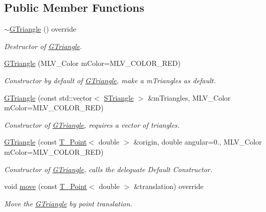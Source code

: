 \subsection*{Public Member Functions}
\begin{DoxyCompactItemize}
\item 
\mbox{\label{classGTriangle_a05bcaee071e6dc6591220869234b05ee}} 
\hyperlink{classGTriangle_a05bcaee071e6dc6591220869234b05ee}{$\sim$\+G\+Triangle} () override
\begin{DoxyCompactList}\small\item\em Destructor of \hyperlink{classGTriangle}{G\+Triangle}. \end{DoxyCompactList}\item 
\hyperlink{classGTriangle_ad4e9c12fdff32b737ca9e67d64c339bc}{G\+Triangle} (M\+L\+V\+\_\+\+Color mColor=M\+L\+V\+\_\+\+C\+O\+L\+O\+R\+\_\+\+R\+ED)
\begin{DoxyCompactList}\small\item\em Constructor by default of \hyperlink{classGTriangle}{G\+Triangle}, make a mTriangles as default. \end{DoxyCompactList}\item
\hyperlink{classGTriangle_a1b5220a52053342a4aa85499e328b9ea}{G\+Triangle} (const std\+::vector$<$ \hyperlink{classSTriangle}{S\+Triangle} $>$ \&mTriangles, M\+L\+V\+\_\+\+Color mColor=M\+L\+V\+\_\+\+C\+O\+L\+O\+R\+\_\+\+R\+ED)
\begin{DoxyCompactList}\small\item\em Constructor of \hyperlink{classGTriangle}{G\+Triangle}, requires a vector of triangles. \end{DoxyCompactList}\item 
\hyperlink{classGTriangle_a1af75c4d0dc8f03e6e4b1b66f0e463ff}{G\+Triangle} (const \hyperlink{classPoint}{T_Point}$<$ double $>$ \&origin, double angular=0., M\+L\+V\+\_\+\+Color mColor=M\+L\+V\+\_\+\+C\+O\+L\+O\+R\+\_\+\+R\+ED)
\begin{DoxyCompactList}\small\item\em Constructor of \hyperlink{classGTriangle}{G\+Triangle}, calls the deleguate Default Constructor. \end{DoxyCompactList}\item 
void \hyperlink{classGTriangle_a6675f3448fca16c1afec576145a9b139}{move} (const \hyperlink{classPoint}{T_Point}$<$ double $>$ \&translation) override
\begin{DoxyCompactList}\small\item\em Move the \hyperlink{classGTriangle}{G\+Triangle} by point translation. \end{DoxyCompactList}\item 

\end{DoxyCompactItemize}
